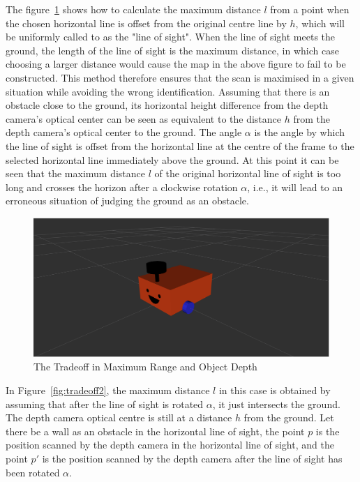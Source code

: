 The figure~\ref{fig:tradeoff} shows how to calculate the maximum distance $l$ from a point when the chosen horizontal line is offset from the original centre line by $h$, 
which will be uniformly called to as the "line of sight". 
When the line of sight meets the ground, the length of the line of sight is the maximum distance, 
in which case choosing a larger distance would cause the map in the above figure to fail to be constructed. 
This method therefore ensures that the scan is maximised in a given situation while avoiding the wrong identification. 
Assuming that there is an obstacle close to the ground, 
its horizontal height difference from the depth camera's optical center can be seen as equivalent to the distance $h$ from the depth camera's optical center to the ground.
The angle $\alpha$ is the angle by which the line of sight is offset from the horizontal line at the centre of the frame to the selected horizontal line immediately above the ground. 
At this point it can be seen that the maximum distance $l$ of the original horizontal line of sight is too long and crosses the horizon after a clockwise rotation $\alpha$,
i.e., it will lead to an erroneous situation of judging the ground as an obstacle.

\begin{figure}[H]
    \centering
    \includegraphics[width=0.8\linewidth]{figs/robot.png}
    \caption{The Tradeoff in Maximum Range and Object Depth}
    \label{fig:tradeoff}
\end{figure}

In Figure~\ref{fig:tradeoff2}, the maximum distance $l$ in this case is obtained by assuming that after the line of sight is rotated $\alpha$, 
it just intersects the ground. The depth camera optical centre is still at a distance $h$ from the ground. 
Let there be a wall as an obstacle in the horizontal line of sight, the point $p$ is the position 
scanned by the depth camera in the horizontal line of sight, and the point $p'$ is the position 
scanned by the depth camera after the line of sight has been rotated $\alpha$.

